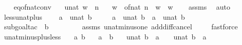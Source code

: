 \begin{isabellebody}
\endisatagproof
{\isafoldproof}%
%
\isadelimproof
\ \ \isanewline
%
\endisadelimproof
\isanewline
\isanewline
{}\isamarkupfalse%
\ eq{\isacharunderscore}of{\isacharunderscore}nat{\isacharunderscore}conv{\isacharcolon}\isanewline
\ \ \ {\isachardoublequoteopen}unat\ w{}\ {\isacharequal}\ n{\isachardoublequoteclose}\isanewline
\ \ \ {\isachardoublequoteopen}w{}\ {\isacharequal}\ of{\isacharunderscore}nat\ n\ {\isasymlongleftrightarrow}\ w{}\ {\isacharequal}\ w{}{\isachardoublequoteclose}\isanewline
%
\isadelimproof
\ \ %
\endisadelimproof
%
\isatagproof
{}\isamarkupfalse%
\ assms\ \isamarkupfalse%
\ auto%
\endisatagproof
{\isafoldproof}%
%
\isadelimproof
\isanewline
%
\endisadelimproof
\isanewline
\isanewline
{}\isamarkupfalse%
\ less{\isacharunderscore}unat{\isacharunderscore}plus{}{\isacharcolon}\ \isanewline
\ \ \ {\isachardoublequoteopen}a\ {\isacharless}\ unat\ {\isacharparenleft}b\ {\isacharplus}\ {}{\isacharparenright}{\isachardoublequoteclose}\isanewline
\ \ \ {\isachardoublequoteopen}a\ {\isacharless}\ unat\ b\ {\isasymor}\ a\ {\isacharequal}\ unat\ b{\isachardoublequoteclose}\isanewline
%
\isadelimproof
\ \ %
\endisadelimproof
%
\isatagproof
{}\isamarkupfalse%
\ {\isacharparenleft}subgoal{\isacharunderscore}tac\ \ {\isachardoublequoteopen}b\ {\isacharplus}\ {}\ {\isasymnoteq}\ {}\ {\isachardoublequoteclose}{\isacharparenright}\isanewline
\ \ \isamarkupfalse%
\ assms\ unat{\isacharunderscore}minus{\isacharunderscore}one\ add{\isacharunderscore}diff{\isacharunderscore}cancel\ \isanewline
\ \ \isamarkupfalse%
\ fastforce{\isacharplus}%
\endisatagproof
{\isafoldproof}%
%
\isadelimproof
\isanewline
%
\endisadelimproof
\isanewline
{}\isamarkupfalse%
\ unat{\isacharunderscore}minus{\isacharunderscore}plus{}{\isacharunderscore}less{\isacharcolon}\isanewline
\ \ \ a\ b\isanewline
\ \ \ {\isachardoublequoteopen}a\ {\isacharless}\ b{\isachardoublequoteclose}\isanewline
\ \ \ {\isachardoublequoteopen}unat\ {\isacharparenleft}b\ {\isacharminus}\ {\isacharparenleft}a\ {\isacharplus}\ {}{\isacharparenright}{\isacharparenright}\ {\isacharless}\ unat\ {\isacharparenleft}b\ {\isacharminus}\ a{\isacharparenright}{\isachardoublequoteclose}\isanewline
%
\isadelimproof
\ \ %
\endisadelimproof
%

\end{isabellebody}
